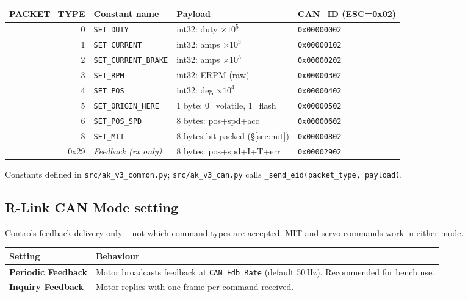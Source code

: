 \documentclass[11pt,a4paper]{article}
\begin{document}
\begin{center}\small
\begin{tabular}{rlll}
\toprule
\textbf{PACKET\_TYPE} & \textbf{Constant name} & \textbf{Payload} &
\textbf{CAN\_ID (ESC=0x02)} \\
\midrule
0 & \texttt{SET\_DUTY}           & int32: duty $\times 10^5$    & \texttt{0x00000002} \\
1 & \texttt{SET\_CURRENT}        & int32: amps $\times 10^3$    & \texttt{0x00000102} \\
2 & \texttt{SET\_CURRENT\_BRAKE} & int32: amps $\times 10^3$    & \texttt{0x00000202} \\
3 & \texttt{SET\_RPM}            & int32: ERPM (raw)             & \texttt{0x00000302} \\
4 & \texttt{SET\_POS}            & int32: deg $\times 10^4$     & \texttt{0x00000402} \\
5 & \texttt{SET\_ORIGIN\_HERE}   & 1 byte: 0=volatile, 1=flash  & \texttt{0x00000502} \\
6 & \texttt{SET\_POS\_SPD}       & 8 bytes: pos+spd+acc         & \texttt{0x00000602} \\
8 & \texttt{SET\_MIT}            & 8 bytes bit-packed (\S\ref{sec:mit}) & \texttt{0x00000802} \\
\midrule
0x29 & \emph{Feedback (rx only)} & 8 bytes: pos+spd+I+T+err     & \texttt{0x00002902} \\
\bottomrule
\end{tabular}
\end{center}

Constants defined in \texttt{src/ak\_v3\_common.py};
\texttt{src/ak\_v3\_can.py} calls \texttt{\_send\_eid(packet\_type, payload)}.

\subsection{R-Link CAN Mode setting}

Controls feedback delivery only -- not which command types are accepted.
MIT and servo commands work in either mode.

\begin{center}\small
\begin{tabular}{lp{9cm}}
\toprule
Setting & Behaviour \\
\midrule
\textbf{Periodic Feedback} & Motor broadcasts feedback at \texttt{CAN Fdb Rate}
                              (default 50\,Hz). Recommended for bench use. \\
\textbf{Inquiry Feedback}  & Motor replies with one frame per command received. \\
\bottomrule
\end{tabular}
\end{center}
\end{document}
